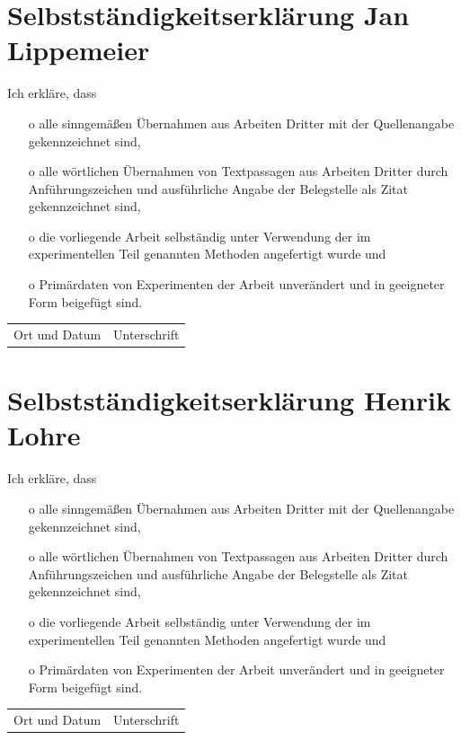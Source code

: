 \section{Selbstständigkeitserklärung Jan Lippemeier}
Ich erkläre, dass
\begin{itemize}
    \item[o] alle sinngemäßen Übernahmen aus Arbeiten Dritter mit der Quellenangabe gekennzeichnet sind,
    \item[o] alle wörtlichen Übernahmen von Textpassagen aus Arbeiten Dritter durch Anführungszeichen und ausführliche Angabe der Belegstelle als Zitat gekennzeichnet sind,
    \item[o] die vorliegende Arbeit selbständig unter Verwendung der im experimentellen Teil genannten Methoden angefertigt wurde und
    \item[o] Primärdaten von Experimenten der Arbeit unverändert und in geeigneter Form beigefügt sind.
\end{itemize}
\vspace*{0.5cm}
\begin{flushleft}
  \begin{table}[H]
      \begin{tabular}{l  l }
          \hline 
          Ort und Datum \hspace*{3cm}  & Unterschrift \hspace*{5cm}
      \end{tabular}    
  \end{table}
\end{flushleft}

\newpage

\section{Selbstständigkeitserklärung Henrik Lohre}
Ich erkläre, dass
\begin{itemize}
    \item[o] alle sinngemäßen Übernahmen aus Arbeiten Dritter mit der Quellenangabe gekennzeichnet sind,
    \item[o] alle wörtlichen Übernahmen von Textpassagen aus Arbeiten Dritter durch Anführungszeichen und ausführliche Angabe der Belegstelle als Zitat gekennzeichnet sind,
    \item[o] die vorliegende Arbeit selbständig unter Verwendung der im experimentellen Teil genannten Methoden angefertigt wurde und
    \item[o] Primärdaten von Experimenten der Arbeit unverändert und in geeigneter Form beigefügt sind.
\end{itemize}
\vspace*{0.5cm}
\begin{flushleft}
  \begin{table}[H]
      \begin{tabular}{l  l }
          \hline 
          Ort und Datum \hspace*{3cm}  & Unterschrift \hspace*{5cm}
      \end{tabular}    
  \end{table}
\end{flushleft}

